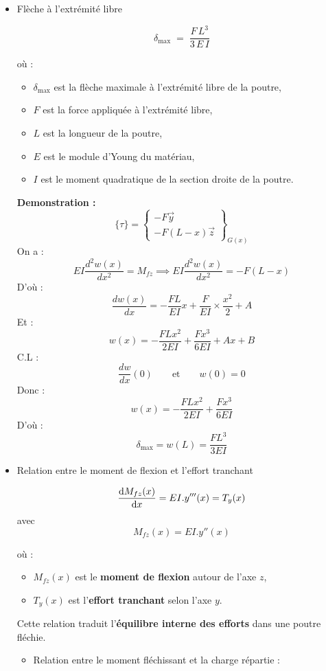 \documentclass[12pt, a4paper]{article}
\begin{document}
\begin{itemize}
    \item Flèche à l'extrémité libre

    \[
\delta_{\text{max}} \;=\; \frac{F\,L^{3}}{3\,E\,I}
\]

où :
\begin{itemize}
  \item $\delta_{\text{max}}$ est la flèche maximale à l'extrémité libre de la poutre,
  \item $F$ est la force appliquée à l’extrémité libre,
  \item $L$ est la longueur de la poutre,
  \item $E$ est le module d’Young du matériau,
  \item $I$ est le moment quadratique de la section droite de la poutre.
\end{itemize}

\textbf{Demonstration :}
\[
\{ \tau \} =  \left\{\begin{matrix}
-F\vec y \\
-F(L-x)\vec z
\end{matrix}\right\}_{G(x)}
\]
On a : 
\[EI\frac{d^2w(x)}{dx^2}=M_{fz}
\implies EI\frac{d^2w(x)}{dx^2}=-F(L-x) \] D'où : 
\[\frac{dw(x)}{dx}=-\frac{FL}{EI}x+\frac{F}{EI}\times\frac{x^2}{2}+A\]
Et : 
\[w(x)=-\frac{FLx^2}{2EI}+\frac{Fx^3}{6EI}+Ax+B\]
C.L :
\[\frac{dw}{dx}(0) \qquad \text{et}\qquad w(0)=0\]
Donc : 
\[w(x)=-\frac{FLx^2}{2EI}+\frac{Fx^3}{6EI}\]
D'où : 
\[\delta_{\max}=w(L)=\frac{FL^3}{3EI}\]

    \item Relation entre le moment de flexion et l'effort tranchant

    \[
\dv{M_{fz}(x)}{x} =EI.y'''(x)= T_y(x)
\]
avec \[
M_{fz}(x) =EI.y''(x)
\]

où :
\begin{itemize}
  \item $M_{fz}(x)$ est le \textbf{moment de flexion} autour de l’axe $z$,
  \item $T_y(x)$ est l’\textbf{effort tranchant} selon l’axe $y$.

\end{itemize}

Cette relation traduit l’\textbf{équilibre interne des efforts} dans une poutre fléchie.

\begin{itemize}
\item Relation entre le moment fléchissant et la charge répartie :


\end{itemize}
\end{itemize}
\end{document}
